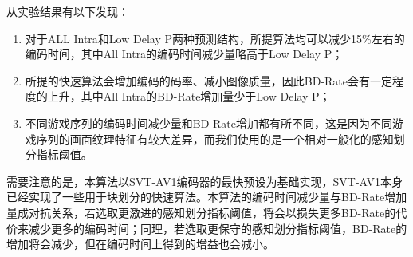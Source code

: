   从实验结果有以下发现：

  \begin{enumerate}[label=\arabic*)]
    \item 对于ALL Intra和Low Delay P两种预测结构，所提算法均可以减少15\%左右的编码时间，其中All Intra的编码时间减少量略高于Low Delay P；
    \item 所提的快速算法会增加编码的码率、减小图像质量，因此BD-Rate会有一定程度的上升，其中All Intra的BD-Rate增加量少于Low Delay P；
    \item 不同游戏序列的编码时间减少量和BD-Rate增加都有所不同，这是因为不同游戏序列的画面纹理特征有较大差异，而我们使用的是一个相对一般化的感知划分指标阈值。
  \end{enumerate}

  需要注意的是，本算法以SVT-AV1编码器的最快预设为基础实现，SVT-AV1本身已经实现了一些用于块划分的快速算法。本算法的编码时间减少量与BD-Rate增加量成对抗关系，若选取更激进的感知划分指标阈值，将会以损失更多BD-Rate的代价来减少更多的编码时间；同理，若选取更保守的感知划分指标阈值，BD-Rate的增加将会减少，但在编码时间上得到的增益也会减小。


